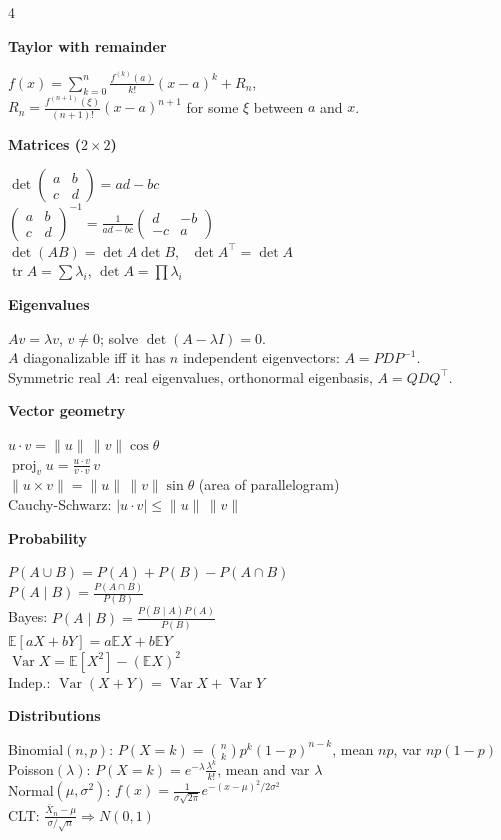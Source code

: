 \documentclass[9pt]{extarticle}
\newcommand{\block}[1]{\par\vspace{2pt}\colorbox{accent!10}{\parbox{\dimexpr\linewidth-2\fboxsep}{\bfseries\color{accent}#1}}\par\vspace{1pt}}
\begin{document}
\begin{multicols}{4}
\block{Taylor with remainder}
$f(x) = \sum_{k=0}^{n} \tfrac{f^{(k)}(a)}{k!}(x-a)^k + R_n$,\\
$R_n = \tfrac{f^{(n+1)}(\xi)}{(n+1)!}(x-a)^{n+1}$ for some $\xi$ between $a$ and $x$.

\block{Matrices ($2\times 2$)}
$\det\begin{pmatrix} a & b\\ c & d \end{pmatrix} = ad - bc$\\
$\begin{pmatrix} a & b\\ c & d\end{pmatrix}^{-1} = \tfrac{1}{ad-bc}\begin{pmatrix} d & -b\\ -c & a \end{pmatrix}$\\
$\det(AB) = \det A \det B$, \ $\det A^{\top} = \det A$\\
$\operatorname{tr} A = \sum \lambda_i$, \quad $\det A = \prod \lambda_i$

\block{Eigenvalues}
$Av = \lambda v$, $v \neq 0$; solve $\det(A - \lambda I) = 0$.\\
$A$ diagonalizable iff it has $n$ independent eigenvectors: $A = PDP^{-1}$.\\
Symmetric real $A$: real eigenvalues, orthonormal eigenbasis, $A = QDQ^{\top}$.

\block{Vector geometry}
$u\cdot v = \lVert u\rVert\,\lVert v\rVert\cos\theta$\\
$\operatorname{proj}_v u = \tfrac{u\cdot v}{v\cdot v}\,v$\\
$\lVert u\times v\rVert = \lVert u\rVert\,\lVert v\rVert\sin\theta$ (area of parallelogram)\\
Cauchy-Schwarz: $|u\cdot v| \le \lVert u\rVert\,\lVert v\rVert$

\block{Probability}
$P(A\cup B) = P(A) + P(B) - P(A\cap B)$\\
$P(A\mid B) = \tfrac{P(A\cap B)}{P(B)}$\\
Bayes: $P(A\mid B) = \tfrac{P(B\mid A)P(A)}{P(B)}$\\
$\mathbb{E}[aX+bY] = a\mathbb{E}X + b\mathbb{E}Y$\\
$\operatorname{Var} X = \mathbb{E}[X^2] - (\mathbb{E}X)^2$\\
Indep.: $\operatorname{Var}(X+Y) = \operatorname{Var}X + \operatorname{Var}Y$

\block{Distributions}
Binomial$(n,p)$: $P(X=k) = \binom{n}{k}p^k(1-p)^{n-k}$, mean $np$, var $np(1-p)$\\
Poisson$(\lambda)$: $P(X=k) = e^{-\lambda}\tfrac{\lambda^k}{k!}$, mean and var $\lambda$\\
Normal$(\mu,\sigma^2)$: $f(x) = \tfrac{1}{\sigma\sqrt{2\pi}}e^{-(x-\mu)^2/2\sigma^2}$\\
CLT: $\tfrac{\bar X_n - \mu}{\sigma/\sqrt n} \Rightarrow N(0,1)$

\end{multicols}
\end{document}
